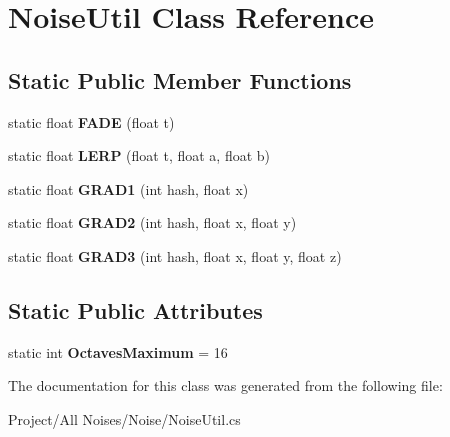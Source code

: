 \hypertarget{class_noise_util}{}\section{Noise\+Util Class Reference}
\label{class_noise_util}
\subsection*{Static Public Member Functions}
\begin{DoxyCompactItemize}
\item 
\mbox{\label{class_noise_util_a0b86dd13deace2f2e95c562f1d123d61}} 
static float {\bfseries F\+A\+DE} (float t)
\item 
\mbox{\label{class_noise_util_ae03f5fa651180f0aa22c9ed54baf6c50}} 
static float {\bfseries L\+E\+RP} (float t, float a, float b)
\item 
\mbox{\label{class_noise_util_a953eb5cfd98c62cade6658e8daf9c19c}} 
static float {\bfseries G\+R\+A\+D1} (int hash, float x)
\item 
\mbox{\label{class_noise_util_a4464da19a847e00a3da1c4ba67b9e346}} 
static float {\bfseries G\+R\+A\+D2} (int hash, float x, float y)
\item 
\mbox{\label{class_noise_util_a1ff08c1b69b5696273722a486751bde0}} 
static float {\bfseries G\+R\+A\+D3} (int hash, float x, float y, float z)
\end{DoxyCompactItemize}
\subsection*{Static Public Attributes}
\begin{DoxyCompactItemize}
\item 
\mbox{\label{class_noise_util_ade7e89a74f0997ca095b1fa017e30a03}} 
static int {\bfseries Octaves\+Maximum} = 16
\end{DoxyCompactItemize}


The documentation for this class was generated from the following file\+:\begin{DoxyCompactItemize}
\item 
Project/\+All Noises/\+Noise/Noise\+Util.\+cs\end{DoxyCompactItemize}
